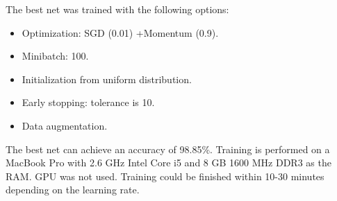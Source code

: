 \documentclass[a4paper]{article}
\begin{document}
The best net was trained with the following options:
\begin{itemize}
	\item  Optimization: SGD (0.01) +Momentum (0.9).
	\item Minibatch: 100.
	\item Initialization from uniform distribution.
	\item Early stopping: tolerance is 10.
	\item Data augmentation.
\end{itemize}
The best net can achieve an accuracy of 98.85\%. Training is performed on a MacBook Pro with 2.6 GHz Intel Core i5 and 8 GB 1600 MHz DDR3 as the RAM. GPU was not used. Training could be finished within 10-30 minutes depending on the learning rate.




	
	
	
\end{document}
